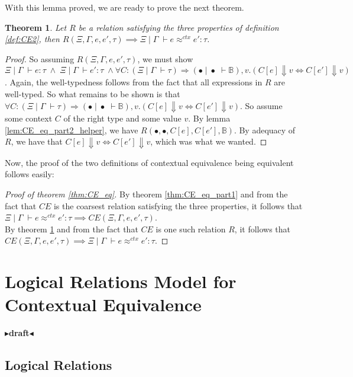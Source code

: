 \documentclass[twoside,11pt,openright]{report}
\newtheorem{theorem}{Theorem}
\theoremstyle{definition}
\newcommand{\expr}{e}
\newcommand{\val}{v}
\newcommand{\ctx}{C}
\newcommand{\Tbool}{\mathbb{B}}
\newcommand{\typ}{\tau}
\newcommand{\venv}{\Gamma}
\newcommand{\tenv}{\Xi}
\newcommand{\emptenv}{\bullet}
\newcommand{\empvenv}{\bullet}
\newcommand{\jdg}[4]{#1 \; | \; #2 \; \vdash #3 : #4}
\newcommand{\jdgType}[3]{#1 \; | \; #2 \; \vdash #3}
\newcommand{\jdgRel}[6]{#1 \; | \; #2 \; \vdash #3 \approx^{#4} #5 : #6}
\newcommand{\ctxRel}[5]{\jdgRel{#1}{#2}{#3}{ctx}{#4}{#5}}
\newcommand{\todo}[1]{{\color[rgb]{.5,0,0}\textbf{$\blacktriangleright$#1$\blacktriangleleft$}}}
\begin{document}
With this lemma proved, we are ready to prove the next theorem.
\begin{theorem}\label{thm:CE_eq_part2}
  Let $R$ be a relation satisfying the three properties of definition \ref{def:CE2}, then $R(\tenv, \venv, \expr, \expr', \typ) \implies \ctxRel{\tenv}{\venv}{\expr}{\expr'}{\typ}$.
\end{theorem}
\begin{proof}
  So assuming $R(\tenv, \venv, \expr, \expr', \typ)$, we must show 
  $\jdg{\tenv}{\venv}{\expr}{\typ} \; \land \; \jdg{\tenv}{\venv}{\expr'}{\typ} \; \land \forall \ctx : (\jdgType{\tenv}{\venv}{\typ}) \Rightarrow (\jdgType{\emptenv}{\empvenv}{\Tbool}), \val . (\ctx[\expr] \Downarrow \val \iff \ctx[\expr'] \Downarrow \val)$. Again, the well-typedness follows from the fact that all expressions in $R$ are well-typed. So what remains to be shown is that $\forall \ctx : (\jdgType{\tenv}{\venv}{\typ}) \Rightarrow (\jdgType{\emptenv}{\empvenv}{\Tbool}), \val . (\ctx[\expr] \Downarrow \val \iff \ctx[\expr'] \Downarrow \val)$. So assume some context $C$ of the right type and some value $\val$. By lemma \ref{lem:CE_eq_part2_helper}, we have $R(\emptenv, \empvenv, C[\expr], C[\expr'], \Tbool)$. By adequacy of $R$, we have that $\ctx[\expr] \Downarrow \val \iff \ctx[\expr'] \Downarrow \val$, which was what we wanted.
\end{proof}

Now, the proof of the two definitions of contextual equivalence being equivalent follows easily:
\begin{proof}[Proof of theorem \ref{thm:CE_eq}]
  By theorem \ref{thm:CE_eq_part1} and from the fact that $CE$ is the coarsest relation satisfying the three properties, it follows that $\ctxRel{\tenv}{\venv}{\expr}{\expr'}{\typ} \implies CE(\tenv, \venv, \expr, \expr', \typ)$.\\
  By theorem \ref{thm:CE_eq_part2} and from the fact that $CE$ is one such relation $R$, it follows that $CE(\tenv, \venv, \expr, \expr', \typ) \implies \ctxRel{\tenv}{\venv}{\expr}{\expr'}{\typ}$.
\end{proof}


\chapter{Logical Relations Model for Contextual Equivalence}
\label{ch:LR}

\todo{draft}
\section{Logical Relations}
\end{document}
